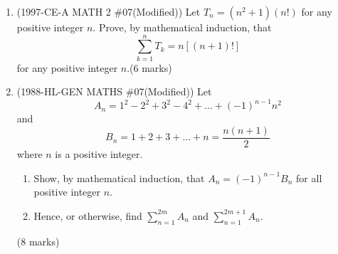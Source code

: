 \documentclass[12pt]{article}
\begin{document}
    \newpage
    \begin{enumerate}
        \item (1997-CE-A MATH 2 \#07(Modified)) Let $T_n=(n^2+1)(n!)$ for any positive integer $n$. Prove, by mathematical induction, that $$\sum_{k=1}^{n}T_k=n[(n+1)!]$$for any positive integer $n$.\hfill(6 marks)
        
            \hrulefill
            
            \hrulefill
            
            \hrulefill
            
            \hrulefill
            
            \hrulefill
            
            \hrulefill
            
            \hrulefill
            
            \hrulefill
            
            \hrulefill
            
            \hrulefill
            
            \hrulefill
            
            \hrulefill
            
            \hrulefill
            
            \hrulefill
            
            \hrulefill
            
            \hrulefill
            
            \hrulefill
            
            \hrulefill
            
            \hrulefill
            
            \hrulefill
            
            \hrulefill
            
            \hrulefill
            
            \hrulefill

        \pagebreak
        \item (1988-HL-GEN MATHS \#07(Modified)) Let $$A_n=1^2-2^2+3^2-4^2+\dots+(-1)^{n-1}n^2$$ and $$B_n=1+2+3+\dots+n=\frac{n(n+1)}{2}$$ where $n$ is a positive integer.\begin{enumerate}
            \item Show, by mathematical induction, that $A_n=(-1)^{n-1}B_n$ for all positive integer $n$.
            \item Hence, or otherwise, find $\displaystyle\sum_{n=1}^{2m}A_n$ and $\displaystyle\sum_{n=1}^{2m+1}A_n$.
        \end{enumerate}\hfill(8 marks)
        

\end{enumerate}
\end{document}
